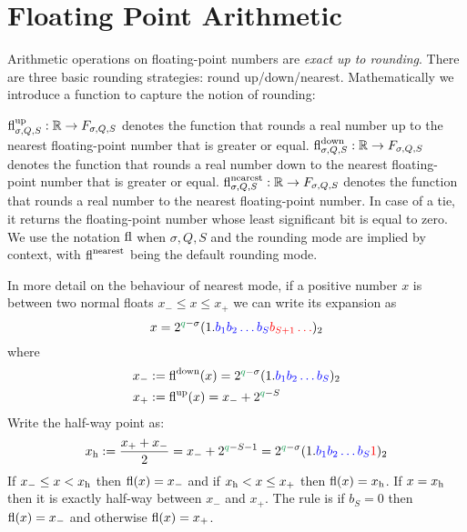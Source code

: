 
\section{Floating Point Arithmetic}
Arithmetic operations on floating-point numbers are  \emph{exact up to rounding}. There are three basic rounding strategies: round up/down/nearest. Mathematically we introduce a function to capture the notion of rounding:

\begin{definition}[rounding] ${\rm fl}^{\rm up}_{\ensuremath{\sigma},Q,S} : \mathbb R \rightarrow F_{\ensuremath{\sigma},Q,S}$ denotes the function that rounds a real number up to the nearest floating-point number that is greater or equal. ${\rm fl}^{\rm down}_{\ensuremath{\sigma},Q,S} : \mathbb R \rightarrow F_{\ensuremath{\sigma},Q,S}$ denotes the function that rounds a real number down to the nearest floating-point number that is greater or equal. ${\rm fl}^{\rm nearest}_{\ensuremath{\sigma},Q,S} : \mathbb R \rightarrow F_{\ensuremath{\sigma},Q,S}$ denotes the function that rounds a real number to the nearest floating-point number. In case of a tie, it returns the floating-point number whose least significant bit is equal to zero. We use the notation ${\rm fl}$ when $\ensuremath{\sigma},Q,S$ and the rounding mode are implied by context, with ${\rm fl}^{\rm nearest}$ being the default rounding mode. \end{definition}

In more detail on the behaviour of nearest mode, if a positive number $x$ is between two normal floats $x_- \ensuremath{\leq} x \ensuremath{\leq} x_+$ we can write its expansion as
\[
x = 2^{\green{q}-\ensuremath{\sigma}} (1.\blue{b_1b_2\ensuremath{\ldots}b_S}\red{b_{S+1}\ensuremath{\ldots}})_2
\]
where
\begin{align*}
x_- &:= {\rm fl}^{\rm down}(x) = 2^{\green{q}-\ensuremath{\sigma}} (1.\blue{b_1b_2\ensuremath{\ldots}b_S})_2 \\
x_+ &:= {\rm fl}^{\rm up}(x) = x_- + 2^{\green{q}-S}
\end{align*}
Write the half-way point as:
\[
x_{\rm h} := {x_+ + x_- \over 2} = x_- + 2^{\green{q}-S-1} = 2^{\green{q}-\ensuremath{\sigma}} (1.\blue{b_1b_2\ensuremath{\ldots}b_S}\red{1})_2
\]
If $x_- \ensuremath{\leq} x < x_{\rm h}$ then ${\rm fl}(x) = x_-$ and if $x_{\rm h} < x \ensuremath{\leq} x_+$ then ${\rm fl}(x) = x_{\rm h}$. If $x = x_{\rm h}$ then it is exactly half-way between $x_-$ and $x_+$. The rule is if $b_S = 0$  then ${\rm fl}(x) = x_-$ and otherwise ${\rm fl}(x) = x_+$.

